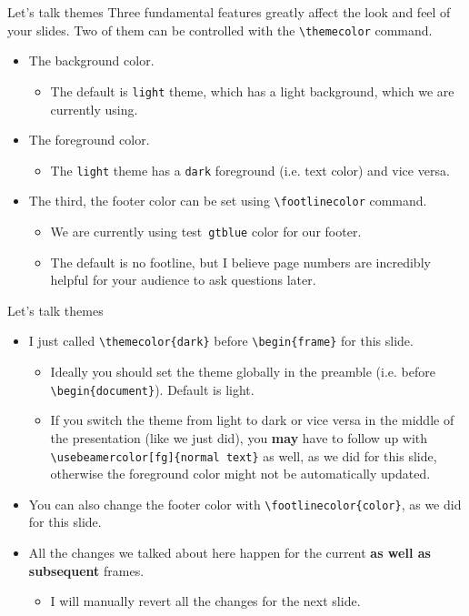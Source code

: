 \documentclass{beamer}
\newcommand{\testcolor}[1]{\colorbox{#1}{\textcolor{#1}{test}}~\texttt{#1}}
\begin{document}
\begin{frame}[fragile]{Let's talk themes}
Three fundamental features greatly affect the look and feel of your slides. Two of them can be controlled with the \verb|\themecolor| command.
\begin{itemize}
\item The background color.
\begin{itemize}
    \item The default is \verb|light| theme, which has a light background, which we are currently using.
\end{itemize}
\item The foreground color.
\begin{itemize}
    \item The \verb|light| theme has a \verb|dark| foreground (i.e. text color) and vice versa.
\end{itemize}
\item The third, the footer color can be set using \verb|\footlinecolor| command.
\begin{itemize}
    \item We are currently using \testcolor{gtblue} color for our footer.
    \item The default is no footline, but I believe page numbers are incredibly helpful for your audience to ask questions later.
\end{itemize}
\end{itemize}
\end{frame}


\begin{frame}[fragile]{Let's talk themes}
\begin{itemize}
\item I just called \verb|\themecolor{dark}| before \verb|\begin{frame}| for this slide.
\begin{itemize}
    \item Ideally you should set the theme globally in the preamble (i.e. before \verb|\begin{document}|). Default is light.
    \item If you switch the theme from light to dark or vice versa in the middle of the presentation (like we just did), you \textbf{may} have to follow up with \verb|\usebeamercolor[fg]{normal text}| as well, as we did for this slide, otherwise the foreground color might not be automatically updated.
\end{itemize}
\item You can also change the footer color with \verb|\footlinecolor{color}|, as we did for this slide.
\item All the changes we talked about here happen for the current \textbf{as well as subsequent} frames.
\begin{itemize}
    \item I will manually revert all the changes for the next slide.
\end{itemize}
\end{itemize}
\end{frame}
\end{document}

